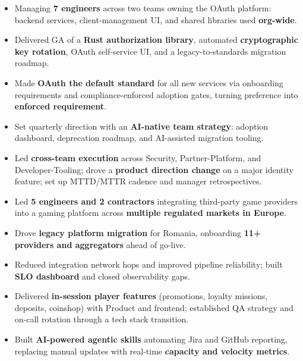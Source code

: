 \documentclass[10pt,a4paper,ragged2e,withhyper]{altacv}
\begin{document}
\else

\begin{itemize}
\item Managing \textbf{7 engineers} across two teams owning the OAuth platform: backend services, client-management UI, and shared libraries used \textbf{org-wide}.
\item Delivered GA of a \textbf{Rust authorization library}, automated \textbf{cryptographic key rotation}, OAuth self-service UI, and a legacy-to-standards migration roadmap.
\item Made \textbf{OAuth the default standard} for all new services via onboarding requirements and compliance-enforced adoption gates, turning preference into \textbf{enforced requirement}.
\item Set quarterly direction with an \textbf{AI-native team strategy}: adoption dashboard, deprecation roadmap, and AI-assisted migration tooling.
\item Led \textbf{cross-team execution} across Security, Partner-Platform, and Developer-Tooling; drove a \textbf{product direction change} on a major identity feature; set up MTTD/MTTR cadence and manager retrospectives.
\end{itemize}

\divider

\begin{itemize}
\item Led \textbf{5 engineers and 2 contractors} integrating third-party game providers into a gaming platform across \textbf{multiple regulated markets in Europe}.
\item Drove \textbf{legacy platform migration} for Romania, onboarding \textbf{11+ providers and aggregators} ahead of go-live.
\item Reduced integration network hops and improved pipeline reliability; built \textbf{SLO dashboard} and closed observability gaps.
\item Delivered \textbf{in-session player features} (promotions, loyalty missions, deposits, coinshop) with Product and frontend; established QA strategy and on-call rotation through a tech stack transition.
\item Built \textbf{AI-powered agentic skills} automating Jira and GitHub reporting, replacing manual updates with real-time \textbf{capacity and velocity metrics}.
\end{itemize}
\end{document}
